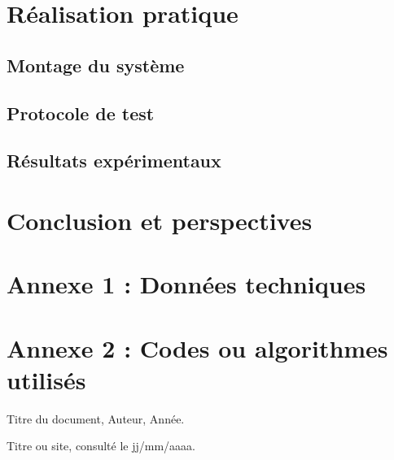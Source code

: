 \documentclass[12pt,a4paper]{article}
\begin{document}
\section{Réalisation pratique}
\subsection{Montage du système}
\subsection{Protocole de test}
\subsection{Résultats expérimentaux}

\section{Conclusion et perspectives}

\appendix
\section{Annexe 1 : Données techniques}
\section{Annexe 2 : Codes ou algorithmes utilisés}

\begin{thebibliography}{9}
Titre du document, Auteur, Année.

Titre ou site, consulté le jj/mm/aaaa.
\end{thebibliography}
\end{document}
